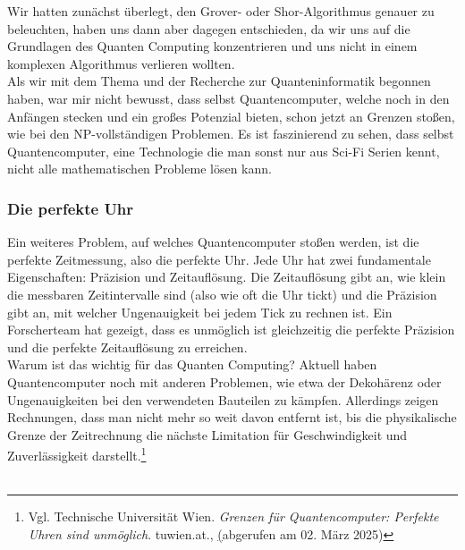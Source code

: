 \begin{tcolorbox}[title=Kommentar,
    title filled=false,
    colback=cyan!5!white,
    colframe=cyan!75!black]
    Wir hatten zunächst überlegt, den Grover- oder Shor-Algorithmus genauer zu beleuchten, haben uns dann aber dagegen entschieden,
    da wir uns auf die Grundlagen des Quanten Computing konzentrieren und uns nicht in einem komplexen Algorithmus verlieren wollten.\\

    Als wir mit dem Thema und der Recherche zur Quanteninformatik begonnen haben, war mir nicht bewusst, dass selbst Quantencomputer,
    welche noch in den Anfängen stecken und ein großes Potenzial bieten, schon jetzt an Grenzen stoßen, wie bei den NP-vollständigen Problemen.
    Es ist faszinierend zu sehen, dass selbst Quantencomputer, eine Technologie die man sonst nur aus Sci-Fi Serien kennt, nicht alle mathematischen Probleme lösen kann.
\end{tcolorbox}

\subsubsection{Die perfekte Uhr}
\label{subsubsec:die-perfekte-uhr}
Ein weiteres Problem, auf welches Quantencomputer stoßen werden, ist die perfekte Zeitmessung, also die perfekte Uhr.
Jede Uhr hat zwei fundamentale Eigenschaften: Präzision und Zeitauflösung.
Die Zeitauflösung gibt an, wie klein die messbaren Zeitintervalle sind (also wie oft die Uhr tickt) und die Präzision gibt an, mit welcher Ungenauigkeit bei jedem Tick zu rechnen ist.
Ein Forscherteam hat gezeigt, dass es unmöglich ist gleichzeitig die perfekte Präzision und die perfekte Zeitauflösung zu erreichen.\\

Warum ist das wichtig für das Quanten Computing?
Aktuell haben Quantencomputer noch mit anderen Problemen, wie etwa der Dekohärenz oder Ungenauigkeiten bei den verwendeten Bauteilen zu kämpfen.
Allerdings zeigen Rechnungen, dass man nicht mehr so weit davon entfernt ist, bis die physikalische Grenze der Zeitrechnung die nächste Limitation für Geschwindigkeit und Zuverlässigkeit darstellt.\footnote{Vgl. Technische Universität Wien. \textit{Grenzen für Quantencomputer: Perfekte Uhren sind unmöglich}. tuwien.at., \href{https://www.tuwien.at/tu-wien/aktuelles/news/grenzen-fuer-quantencomputer-perfekte-uhren-sind-unmoeglich} (abgerufen am 02. März 2025)}\\\\


